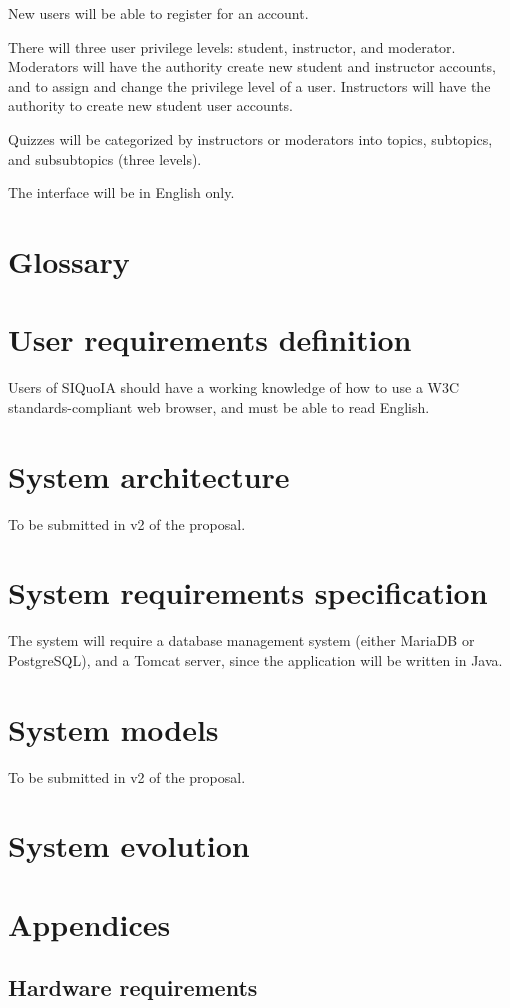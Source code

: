 \documentclass[12pt]{article}
\begin{document}
New users will be able to register for an account.

There will three user privilege levels: student, instructor, and
moderator. Moderators will have the authority create new student and
instructor accounts, and to assign and change the privilege level of a
user. Instructors will have the authority to create new student user
accounts.

Quizzes will be categorized by instructors or moderators into topics,
subtopics, and subsubtopics (three levels).

The interface will be in English only.

\section{Glossary}
\printglossaries

\section{User requirements definition}
Users of SIQuoIA should have a working knowledge of how to use a
\gls{W3C} standards-compliant web browser, and must be able to read
English.

\section{System architecture}
To be submitted in v2 of the proposal.

\section{System requirements specification}
The system will require a database management system (either MariaDB
or PostgreSQL), and a Tomcat server, since the application will be
written in Java.

\section{System models}
To be submitted in v2 of the proposal.

\section{System evolution}


\section{Appendices}

\subsection{Hardware requirements}

\printindex




\end{document}
